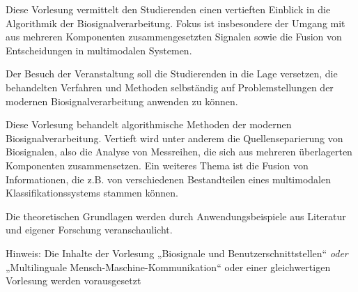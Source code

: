 \begin{module}
\begin{styleenv}
\begin{recommendations}
\end{recommendations}
\end{styleenv}

\begin{learningoutcomes}
Diese Vorlesung vermittelt den Studierenden einen vertieften Einblick in die Algorithmik der Biosignalverarbeitung. Fokus ist insbesondere der Umgang mit aus mehreren Komponenten zusammengesetzten Signalen sowie die Fusion von Entscheidungen in multimodalen Systemen.

 

Der Besuch der Veranstaltung soll die Studierenden in die Lage versetzen, die behandelten Verfahren und Methoden selbständig auf Problemstellungen der modernen Biosignalverarbeitung anwenden zu können.


\end{learningoutcomes}

\begin{content}
Diese Vorlesung behandelt algorithmische Methoden der modernen Biosignalverarbeitung. Vertieft wird unter anderem die Quellenseparierung von Biosignalen, also die Analyse von Messreihen, die sich aus mehreren überlagerten Komponenten zusammensetzen. Ein weiteres Thema ist die Fusion von Informationen, die z.B. von verschiedenen Bestandteilen eines multimodalen Klassifikationssystems stammen können.

 

Die theoretischen Grundlagen werden durch Anwendungsbeispiele aus Literatur und eigener Forschung veranschaulicht.

 

Hinweis: Die Inhalte der Vorlesung „Biosignale und Benutzerschnittstellen“ \emph{oder} „Multilinguale Mensch-Maschine-Kommunikation“ oder einer gleichwertigen Vorlesung werden vorausgesetzt


\end{content}



\end{module}

